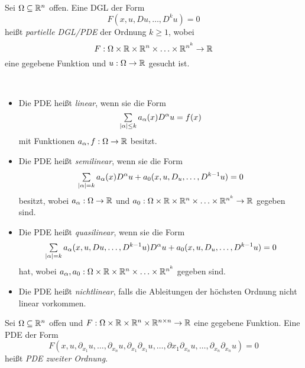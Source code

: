 \documentclass{cheat-sheet}
\begin{document}





\begin{defn}
  Sei $\Omega \subseteq \mathbb{R}^n$ offen.
  Eine DGL der Form
  \[ F(x, u, Du, \ldots, D^k u) = 0 \]
  heißt \emph{partielle DGL/PDE} der Ordnung $k \geq 1$, wobei
  \[ F : \Omega \times \mathbb{R} \times \mathbb{R}^n \times \ldots \times \mathbb{R}^{n^k} \to \mathbb{R} \]
  eine gegebene Funktion und $u : \Omega \to \mathbb{R}$ gesucht ist.
\end{defn}

\begin{defn}\mbox{}\\
  \begin{itemize}
    \item Die PDE heißt \emph{linear}, wenn sie die Form
    \[ \sum_{\abs{\alpha} \leq k} a_\alpha(x) D^\alpha u = f(x) \]
    mit Funktionen $a_\alpha, f : \Omega \to \mathbb{R}$ besitzt.
    \item Die PDE heißt \emph{semilinear}, wenn sie die Form
    \[ \sum_{\abs{\alpha} = k} a_\alpha(x) D^\alpha u + a_0(x, u, D_u, \ldots, D^{k-1} u) = 0 \]
    besitzt, wobei $a_\alpha : \Omega \to \mathbb{R}$ und $a_0 : \Omega \times \mathbb{R} \times \mathbb{R}^n \times \ldots \times \mathbb{R}^{n^k} \to \mathbb{R}$ gegeben sind.
    \item Die PDE heißt \emph{quasilinear}, wenn sie die Form
    \[ \sum_{\abs{\alpha} = k} a_\alpha(x, u, Du, \ldots, D^{k-1} u) D^\alpha u + a_0(x, u, D_u, \ldots, D^{k-1} u) = 0 \]
    hat, wobei $a_\alpha, a_0 : \Omega \times \mathbb{R} \times \mathbb{R}^n \times \ldots \times \mathbb{R}^{n^k}$ gegeben sind.
    \item Die PDE heißt \emph{nichtlinear}, falls die Ableitungen der höchsten Ordnung nicht linear vorkommen.
  \end{itemize}
\end{defn}


\begin{defn}
  Sei $\Omega \subseteq \mathbb{R}^n$ offen und $F : \Omega \times \mathbb{R} \times \mathbb{R}^n \times \mathbb{R}^{n \times n} \to \mathbb{R}$ eine gegebene Funktion.
  Eine PDE der Form
  \[ F(x, u, \partial_{x_1} u, \ldots, \partial_{x_n} u, \partial_{x_1} \partial_{x_1} u, \ldots, \partial{x_1} \partial_{x_n} u, \ldots, \partial_{x_n} \partial_{x_n} u) = 0 \]
  heißt \emph{PDE zweiter Ordnung}.
\end{defn}
\end{document}
